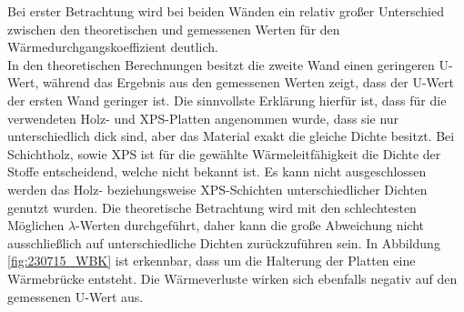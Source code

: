 Bei erster Betrachtung wird bei beiden Wänden ein relativ großer Unterschied zwischen den theoretischen und gemessenen Werten für den Wärmedurchgangskoeffizient deutlich.\\
In den theoretischen Berechnungen besitzt die zweite Wand einen geringeren U-Wert, während das Ergebnis aus den gemessenen Werten zeigt, dass der U-Wert der ersten Wand geringer ist.
Die sinnvollste Erklärung hierfür ist, dass für die verwendeten Holz- und XPS-Platten angenommen wurde, dass sie nur unterschiedlich dick sind, aber das Material exakt die gleiche Dichte besitzt.
Bei Schichtholz, sowie XPS ist für die gewählte Wärmeleitfähigkeit die Dichte der Stoffe entscheidend, welche nicht bekannt ist.
Es kann nicht ausgeschlossen werden das Holz- beziehungsweise XPS-Schichten unterschiedlicher Dichten genutzt wurden.
Die theoretische Betrachtung wird mit den schlechtesten Möglichen $\lambda$-Werten durchgeführt, daher kann die große Abweichung nicht ausschließlich auf unterschiedliche Dichten zurückzuführen sein.
In Abbildung \ref{fig:230715_WBK} ist erkennbar, dass um die Halterung der Platten eine Wärmebrücke entsteht. Die Wärmeverluste wirken sich ebenfalls negativ auf den gemessenen U-Wert aus.
\\

